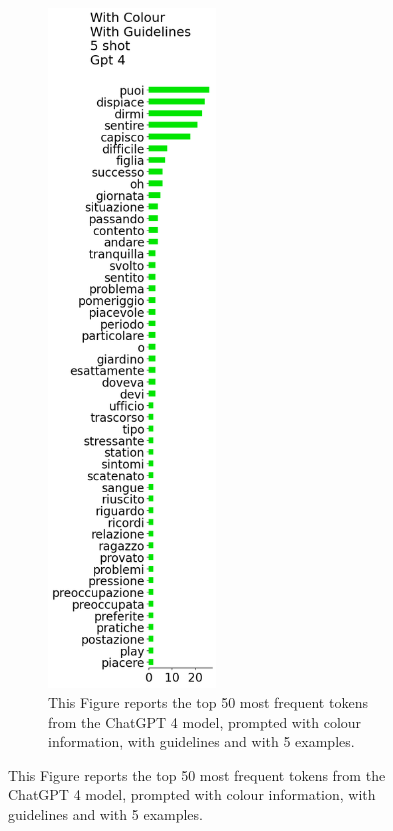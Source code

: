 \begin{figure}[!htbp]
\begin{subfigure}[t]{0.45\textwidth}
        \label{sub:persona-narrative-elicitation-comparison-distribution-falcon}
    \end{subfigure}
    \hspace{-2cm}
    \begin{subfigure}[t]{0.3\textwidth}
        \centering
        \includegraphics[height=18cm]{assets/imgs/tokens-vertical/with_color/with_guidelines/5_shot/token_distribution_with_color_with_guidelines_5_shot_gpt-4.png}
        \caption{This Figure reports the top 50 most frequent tokens from the ChatGPT 4 model, prompted with colour information, with guidelines and with 5 examples.}
            \label{sub:persona-narrative-elicitation-comparison-distribution-gpt-4}
    \end{subfigure}

\end{figure}
